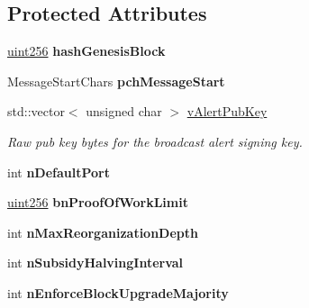 \subsection*{Protected Attributes}
\begin{DoxyCompactItemize}
\item 
\mbox{\label{class_c_chain_params_a3033bae1b7e966358f80b6cbb2e2a3d8}} 
\mbox{\hyperlink{classuint256}{uint256}} {\bfseries hash\+Genesis\+Block}
\item 
\mbox{\label{class_c_chain_params_a06130a926927697ae8a6c211a60233a7}} 
Message\+Start\+Chars {\bfseries pch\+Message\+Start}
\item 
\mbox{\label{class_c_chain_params_adf435bdf2d9cd00936d7da0fb4237921}} 
std\+::vector$<$ unsigned char $>$ \mbox{\hyperlink{class_c_chain_params_adf435bdf2d9cd00936d7da0fb4237921}{v\+Alert\+Pub\+Key}}
\begin{DoxyCompactList}\small\item\em Raw pub key bytes for the broadcast alert signing key. \end{DoxyCompactList}\item 
\mbox{\label{class_c_chain_params_a76d9a8dc59e179ca94b6b9e04a93e5f4}} 
int {\bfseries n\+Default\+Port}
\item 
\mbox{\label{class_c_chain_params_ac9b383ab55dbc41f87c5d5f21ec245ac}} 
\mbox{\hyperlink{classuint256}{uint256}} {\bfseries bn\+Proof\+Of\+Work\+Limit}
\item 
\mbox{\label{class_c_chain_params_a8648767ca452c2a20c68ede2c7b54e77}} 
int {\bfseries n\+Max\+Reorganization\+Depth}
\item 
\mbox{\label{class_c_chain_params_a8618df6217285a39e86d44fba35a21af}} 
int {\bfseries n\+Subsidy\+Halving\+Interval}
\item 
\mbox{\label{class_c_chain_params_aee2c84cf7f2c75f086953fd690d30532}} 
int {\bfseries n\+Enforce\+Block\+Upgrade\+Majority}
\item 
\mbox{\label{class_c_chain_params_a47b7660a7f47f6c7bc7c5e7c02d86c4f}} 

\end{DoxyCompactItemize}
